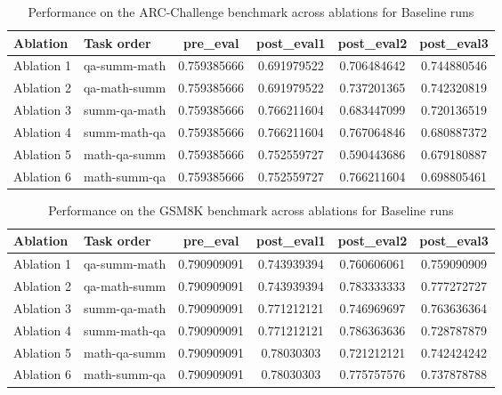 \begin{table}[!ht]
    \centering
    \caption{Performance on the ARC-Challenge benchmark across ablations for Baseline runs}
    \begin{tabular}{|l|l|S[table-format=2.4]|S[table-format=2.4]|S[table-format=2.4]|S[table-format=2.4]|}
    \hline
        \textbf{Ablation} & \textbf{Task order} & \textbf{pre\_eval} & \textbf{post\_eval1} & \textbf{post\_eval2} & \textbf{post\_eval3 } \\ \hline
        Ablation 1 & qa-summ-math & 0.759385666 & 0.691979522 & 0.706484642 & 0.744880546  \\ 
        Ablation 2 & qa-math-summ & 0.759385666 & 0.691979522 & 0.737201365 & 0.742320819  \\ 
        Ablation 3 & summ-qa-math & 0.759385666 & 0.766211604 & 0.683447099 & 0.720136519  \\ 
        Ablation 4 & summ-math-qa & 0.759385666 & 0.766211604 & 0.767064846 & 0.680887372  \\ 
        Ablation 5 & math-qa-summ & 0.759385666 & 0.752559727 & 0.590443686 & 0.679180887  \\ 
        Ablation 6 & math-summ-qa & 0.759385666 & 0.752559727 & 0.766211604 & 0.698805461  \\ \hline
    \end{tabular}
    \label{tab:ARCBaseline}
\end{table}

\begin{table}[!ht]
    \centering
    \caption{Performance on the GSM8K benchmark across ablations for Baseline runs}
    \begin{tabular}{|l|l|S[table-format=2.4]|S[table-format=2.4]|S[table-format=2.4]|S[table-format=2.4]|}
    \hline
        \textbf{Ablation} & \textbf{Task order} & \textbf{pre\_eval} & \textbf{post\_eval1} & \textbf{post\_eval2} & \textbf{post\_eval3 } \\ \hline
        Ablation 1 & qa-summ-math & 0.790909091 & 0.743939394 & 0.760606061 & 0.759090909  \\ 
        Ablation 2 & qa-math-summ & 0.790909091 & 0.743939394 & 0.783333333 & 0.777272727  \\ 
        Ablation 3 & summ-qa-math & 0.790909091 & 0.771212121 & 0.746969697 & 0.763636364  \\ 
        Ablation 4 & summ-math-qa & 0.790909091 & 0.771212121 & 0.786363636 & 0.728787879  \\ 
        Ablation 5 & math-qa-summ & 0.790909091 & 0.78030303 & 0.721212121 & 0.742424242  \\ 
        Ablation 6 & math-summ-qa & 0.790909091 & 0.78030303 & 0.775757576 & 0.737878788  \\ \hline
    \end{tabular}
    \label{tab:GSM8KBaseline}
\end{table}

